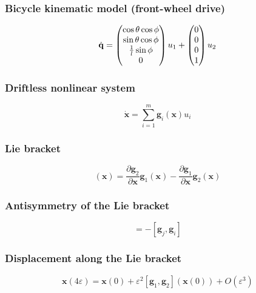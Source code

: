 \subsubsection{Bicycle kinematic model (front-wheel drive)}
\begin{equation*}
    {\dot{\mathbf q}}=\begin{pmatrix}\cos\theta\cos\phi\\\sin\theta\cos\phi\\\frac{1}{l}\sin\phi\\0\end{pmatrix}u_1+\begin{pmatrix}0\\0\\0\\1\end{pmatrix}u_2
\end{equation*}

\subsubsection{Driftless nonlinear system}
\begin{equation*}
    \dot{\mathbf x}=\sum_{i=1}^m\mathbf g_i(\mathbf x)u_i
\end{equation*}

\subsubsection{Lie bracket}
\begin{equation*}
    [\mathbf g_1,\mathbf g_2](\mathbf x)=\frac{\partial \mathbf g_2}{\partial \mathbf x}\mathbf g_1(\mathbf x)-\frac{\partial \mathbf g_1}{\partial \mathbf x}\mathbf g_2(\mathbf x)
\end{equation*}

\subsubsection{Antisymmetry of the Lie bracket}
\begin{equation*}
    [\mathbf g_i,\mathbf g_j]=-[\mathbf g_j,\mathbf g_i]
\end{equation*}

\subsubsection{Displacement along the Lie bracket}
\begin{equation*}
    \mathbf x(4\varepsilon)=\mathbf x(0)+\varepsilon^2[\mathbf g_1,\mathbf g_2](\mathbf x(0))+O(\varepsilon^3)
\end{equation*}

